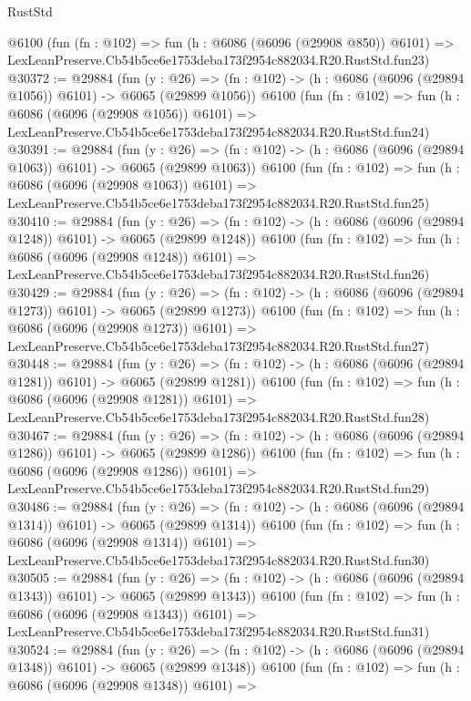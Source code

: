 \begin{lexlean}{RustStd}
\begin{coremodule}
    @6100
    (fun (fn : @102) =>
    fun (h : @6086 (@6096 (@29908 @850)) @6101) =>
    LexLeanPreserve.Cb54b5ce6e1753deba173f2954c882034.R20.RustStd.fun23)
@30372 := @29884
    (fun (y : @26) =>
    (fn : @102) -> (h : @6086 (@6096 (@29894 @1056)) @6101) -> @6065 (@29899 @1056))
    @6100
    (fun (fn : @102) =>
    fun (h : @6086 (@6096 (@29908 @1056)) @6101) =>
    LexLeanPreserve.Cb54b5ce6e1753deba173f2954c882034.R20.RustStd.fun24)
@30391 := @29884
    (fun (y : @26) =>
    (fn : @102) -> (h : @6086 (@6096 (@29894 @1063)) @6101) -> @6065 (@29899 @1063))
    @6100
    (fun (fn : @102) =>
    fun (h : @6086 (@6096 (@29908 @1063)) @6101) =>
    LexLeanPreserve.Cb54b5ce6e1753deba173f2954c882034.R20.RustStd.fun25)
@30410 := @29884
    (fun (y : @26) =>
    (fn : @102) -> (h : @6086 (@6096 (@29894 @1248)) @6101) -> @6065 (@29899 @1248))
    @6100
    (fun (fn : @102) =>
    fun (h : @6086 (@6096 (@29908 @1248)) @6101) =>
    LexLeanPreserve.Cb54b5ce6e1753deba173f2954c882034.R20.RustStd.fun26)
@30429 := @29884
    (fun (y : @26) =>
    (fn : @102) -> (h : @6086 (@6096 (@29894 @1273)) @6101) -> @6065 (@29899 @1273))
    @6100
    (fun (fn : @102) =>
    fun (h : @6086 (@6096 (@29908 @1273)) @6101) =>
    LexLeanPreserve.Cb54b5ce6e1753deba173f2954c882034.R20.RustStd.fun27)
@30448 := @29884
    (fun (y : @26) =>
    (fn : @102) -> (h : @6086 (@6096 (@29894 @1281)) @6101) -> @6065 (@29899 @1281))
    @6100
    (fun (fn : @102) =>
    fun (h : @6086 (@6096 (@29908 @1281)) @6101) =>
    LexLeanPreserve.Cb54b5ce6e1753deba173f2954c882034.R20.RustStd.fun28)
@30467 := @29884
    (fun (y : @26) =>
    (fn : @102) -> (h : @6086 (@6096 (@29894 @1286)) @6101) -> @6065 (@29899 @1286))
    @6100
    (fun (fn : @102) =>
    fun (h : @6086 (@6096 (@29908 @1286)) @6101) =>
    LexLeanPreserve.Cb54b5ce6e1753deba173f2954c882034.R20.RustStd.fun29)
@30486 := @29884
    (fun (y : @26) =>
    (fn : @102) -> (h : @6086 (@6096 (@29894 @1314)) @6101) -> @6065 (@29899 @1314))
    @6100
    (fun (fn : @102) =>
    fun (h : @6086 (@6096 (@29908 @1314)) @6101) =>
    LexLeanPreserve.Cb54b5ce6e1753deba173f2954c882034.R20.RustStd.fun30)
@30505 := @29884
    (fun (y : @26) =>
    (fn : @102) -> (h : @6086 (@6096 (@29894 @1343)) @6101) -> @6065 (@29899 @1343))
    @6100
    (fun (fn : @102) =>
    fun (h : @6086 (@6096 (@29908 @1343)) @6101) =>
    LexLeanPreserve.Cb54b5ce6e1753deba173f2954c882034.R20.RustStd.fun31)
@30524 := @29884
    (fun (y : @26) =>
    (fn : @102) -> (h : @6086 (@6096 (@29894 @1348)) @6101) -> @6065 (@29899 @1348))
    @6100
    (fun (fn : @102) =>
    fun (h : @6086 (@6096 (@29908 @1348)) @6101) =>

\end{coremodule}
\end{lexlean}
